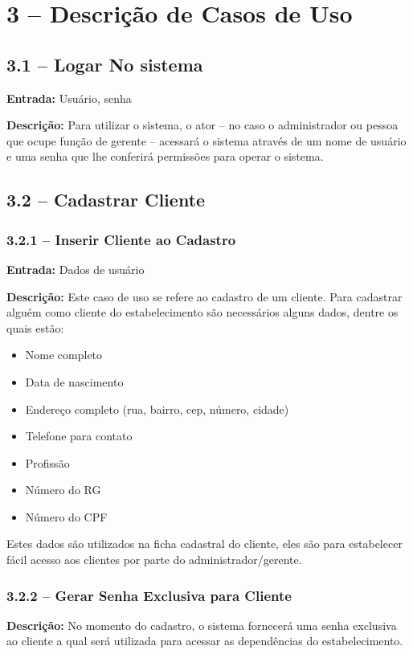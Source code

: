 \documentclass[12pt,a4paper,oneside]{report}
\begin{document}
	\section*{3 -- Descrição de Casos de Uso}
	\subsection*{3.1 -- Logar No sistema}
	\textbf{Entrada:} Usuário, senha 
	
	\textbf{Descrição:} Para utilizar o sistema, o ator -- no caso o administrador ou pessoa que ocupe função de gerente -- acessará o sistema através de um nome de usuário e uma senha que lhe conferirá permissões para operar o sistema.
	
	\subsection*{3.2 -- Cadastrar Cliente}
	\subsubsection*{3.2.1 -- Inserir Cliente ao Cadastro}
	\textbf{Entrada:} Dados de usuário

	\textbf{Descrição:} Este caso de uso se refere ao cadastro de um cliente. Para cadastrar alguém como cliente do estabelecimento são necessários alguns dados, dentre os quais estão: 
	
	\begin{itemize}
		\item Nome completo
		\item Data de nascimento
		\item Endereço completo (rua, bairro, cep, número, cidade)
		\item Telefone para contato
		\item Profissão
		\item Número do RG
		\item Número do CPF
	\end{itemize}
	Estes dados são utilizados na ficha cadastral do cliente, eles são para estabelecer fácil acesso aos clientes por parte do administrador/gerente.
	\subsubsection*{3.2.2 -- Gerar Senha Exclusiva para Cliente}
	\textbf{Descrição:} No momento do cadastro, o sistema fornecerá uma senha exclusiva ao cliente a qual será utilizada para acessar as dependências do estabelecimento.
\end{document}
